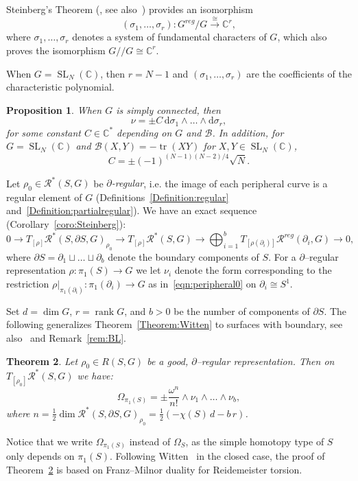 \documentclass[11pt]{article}
\newtheorem{theo}{Theorem}[section]
\newtheorem{prop}[theo]{Proposition}
\theoremstyle{definition}
\numberwithin{equation}{section}
\numberwithin{figure}{section}
\numberwithin{table}{section}
\DeclareMathOperator{\SL}{SL}
\DeclareMathOperator{\rank}{rank}
\DeclareMathOperator{\tr}{tr}
\newcommand{\Bcal}{\mathcal{B}}
\newcommand{\Rcal}{\mathcal{R}}
\newcommand{\Cbb}{\mathbb{C}}
\newcommand*{\dd}{\mathrm{d}}
\newcommand*\dG{{d}}
\newcommand*\bS{b}
\newcommand*\Rg{\Rcal^*}
\begin{document}
Steinberg's Theorem (\cite{SteinbergIHES}, see also~\cite{Steinberg,Popov}) provides an isomorphism
\[
(\sigma_1,\dots,\sigma_r)\colon G^{reg}/ G\overset{\cong} \longrightarrow \Cbb^r,
\]
where $\sigma_1,\dots, \sigma_r$ denotes a system of fundamental characters of $G$, which also proves the isomorphism $G /\!\!/ G \cong \Cbb^r$.

When $G=\SL_N (\Cbb)$, then $r=N-1$ and $(\sigma_1,\dots,\sigma_r)$ are the coefficients of the characteristic polynomial.


\begin{prop}\label{prop:Steinberg}
When $G$ is simply connected, then
\[
\nu= \pm C\, \dd\sigma_1\wedge\dots \wedge \dd\sigma_r,
\]
for some constant $C\in\Cbb^*$ depending on $G$ and $\Bcal$. In addition, for $G=\SL_N (\Cbb)$ and $\Bcal(X,Y)=- \tr(XY)$ for $X,Y\in \SL_N (\Cbb)$,
\[
C=\pm (-1)^{(N-1)(N-2)/4}\sqrt{N}.
\]
\end{prop}


Let $\rho_0\in \Rg(S,G) $ be \emph{$\partial$-regular}, i.e. the image of each peripheral curve is a regular element of $G$ (Definitions~\ref{Definition:regular} and~\ref{Definition:partialregular}). We have an exact sequence (Corollary~\ref{coro:Steinberg}):
\[
0\to T_{[\rho]}\Rcal^*(S,\partial S,G)_{\rho_0} \to T_{[\rho]}\Rcal^*(S,G) \to \bigoplus_{i=1}^b T_{[\rho(\partial_i)]} \Rcal^{reg}(\partial_i, G)
\to 0,
\]
where $\partial S=\partial_1\sqcup\dots\sqcup \partial_\bS$ denote the boundary components of $S$. For a $\partial$--regular representation $\rho\colon\pi_1(S)\to G$ we let $\nu_i$ denote the form corresponding to the restriction $\rho|_{\pi_1(\partial_i)}\colon \pi_1(\partial_i)\to G$ as in~\eqref{eqn:peripheral0} on $\partial_i\cong S^1$.

Set $\dG=\dim G$, $r=\rank G$, and $\bS>0$ be the number of components of $\partial S$. The following generalizes Theorem~\ref{Theorem:Witten} to surfaces with boundary, \cite{Witten} see also~\cite[Theorem~5.40]{BL} and Remark~\ref{rem:BL}.


\begin{theo}\label{Thm:vol}
Let $\rho_0\in R(S,G)$ be a good, $\partial$--regular representation. Then on $T_{[\rho_0]} \Rg(S,G)$ we have:
\[
\Omega_{\pi_1(S)}=\pm
\frac{\omega^n}{n!}\wedge \nu_1\wedge\dots\wedge\nu_\bS,
\]
where $n = \frac{1}{2} \dim \Rcal^*(S,\partial S,G)_{\rho_0} = \frac12(-\chi(S)\, \dG - b\, r)$.
\end{theo}

Notice that we write $\Omega_{\pi_1(S)}$ instead of $\Omega_{S}$, as the simple homotopy type of $S$ only depends on $\pi_1(S)$. Following Witten~\cite{Witten} in the closed case, the proof of Theorem~\ref{Thm:vol} is based on Franz--Milnor duality for Reidemeister torsion.
\end{document}
